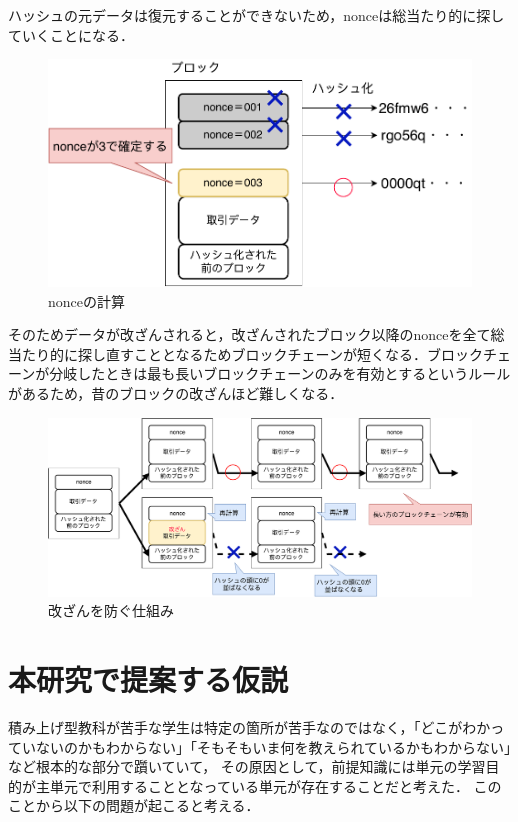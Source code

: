 \documentclass[a4j,12pt]{jsarticle}
\begin{document}
ハッシュの元データは復元することができないため，nonceは総当たり的に探していくことになる．

\begin{figure}[H]
\centering
\includegraphics[width=14cm]{nonce.pdf}
\caption{nonceの計算}
\label{fig:no}
\end{figure} 

そのためデータが改ざんされると，改ざんされたブロック以降のnonceを全て総当たり的に探し直すこととなるためブロックチェーンが短くなる．ブロックチェーンが分岐したときは最も長いブロックチェーンのみを有効とするというルールがあるため，昔のブロックの改ざんほど難しくなる．

\begin{figure}[H]
\centering
\includegraphics[width=14cm]{blockk.pdf}
\caption{改ざんを防ぐ仕組み}
\label{fig:no}
\end{figure} 

\newpage
\section{本研究で提案する仮説}
積み上げ型教科が苦手な学生は特定の箇所が苦手なのではなく，「どこがわかっていないのかもわからない」「そもそもいま何を教えられているかもわからない」など根本的な部分で躓いていて，
その原因として，前提知識には単元の学習目的が主単元で利用することとなっている単元が存在することだと考えた．
このことから以下の問題が起こると考える．
\end{document}
